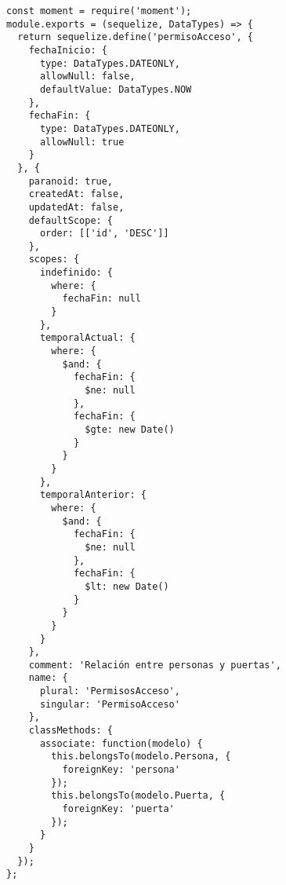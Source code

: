 \begin{lstlisting}[label=anx:modelo_permiso_acceso]
const moment = require('moment');
module.exports = (sequelize, DataTypes) => {
  return sequelize.define('permisoAcceso', {
    fechaInicio: {
      type: DataTypes.DATEONLY,
      allowNull: false,
      defaultValue: DataTypes.NOW
    },
    fechaFin: {
      type: DataTypes.DATEONLY,
      allowNull: true
    }
  }, {
    paranoid: true,
    createdAt: false,
    updatedAt: false,
    defaultScope: {
      order: [['id', 'DESC']]
    },
    scopes: {
      indefinido: {
        where: {
          fechaFin: null
        }
      },
      temporalActual: {
        where: {
          $and: {
            fechaFin: {
              $ne: null
            },
            fechaFin: {
              $gte: new Date()
            }
          }
        }
      },
      temporalAnterior: {
        where: {
          $and: {
            fechaFin: {
              $ne: null
            },
            fechaFin: {
              $lt: new Date()
            }
          }
        }
      }
    },
    comment: 'Relación entre personas y puertas',
    name: {
      plural: 'PermisosAcceso',
      singular: 'PermisoAcceso'
    },
    classMethods: {
      associate: function(modelo) {
        this.belongsTo(modelo.Persona, {
          foreignKey: 'persona'
        });
        this.belongsTo(modelo.Puerta, {
          foreignKey: 'puerta'
        });
      }
    }
  });
};
\end{lstlisting}